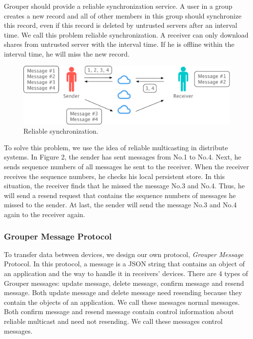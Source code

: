 \documentclass[twocolumn,10pt]{article}
\begin{document}
Grouper should provide a reliable synchronization service. 
A user in a group creates a new record and all of other members in this group should synchronize this record, even if this record is deleted by untrusted servers after an interval time. 
We call this problem reliable synchronization. 
A receiver can only download shares from untrusted server with the interval time. 
If he is offline within the interval time, he will miss the new record.

\begin{figure}[t]
	\centering
	\includegraphics[scale=0.32]{reliable_sync}
	\caption{Reliable synchronization.}
\end{figure}

To solve this problem, we use the idea of reliable multicasting in distribute systems. 
In Figure 2, the sender has sent messages from No.1 to No.4. 
Next, he sends sequence numbers of all messages he sent to the receiver. 
When the receiver receives the sequence numbers, he checks his local persistent store. 
In this situation, the receiver finds that he missed the message No.3 and No.4. 
Thus, he will send a resend request that contains the sequence numbers of messages he missed to the sender. 
At last, the sender will send the message No.3 and No.4 again to the receiver again.

\subsubsection{Grouper Message Protocol}

To transfer data between devices, we design our own protocol, \emph{Grouper Message} Protocol. 
In this protocol, a message is a JSON string that contains an object of an application and the way to handle it in receivers’ devices. 
There are 4 types of Grouper messages: update message, delete message, confirm message and resend message. 
Both update message and delete message need resending because they contain the objects of an application. 
We call these messages normal messages. 
Both confirm message and resend message contain control information about reliable multicast and need not resending. 
We call these messages control messages.
\end{document}

